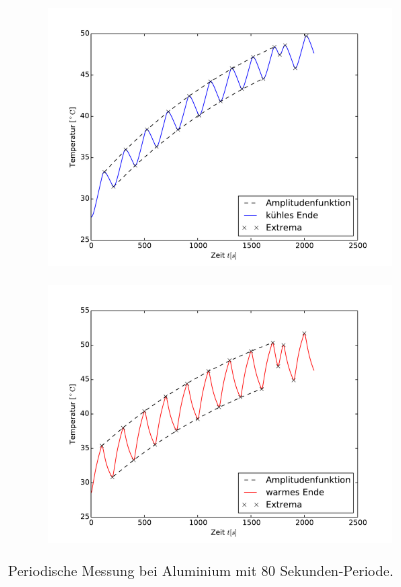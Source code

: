 \begin{figure}[h]
	\label{fig:M2Alu}
	\centering
	\begin{subfigure}{0.9\textwidth}
	\centering
	\includegraphics[width=\textwidth]{Bilder/M2_Alu_kuehl.pdf}
	\end{subfigure}
	\begin{subfigure}{0.9\textwidth}
	\centering
	\includegraphics[width=\textwidth]{Bilder/M2_Alu_warm.pdf}
	\end{subfigure}
	\caption{Periodische Messung bei Aluminium mit 80 Sekunden-Periode.}
\label{fig:M2Alu}
\end{figure}
